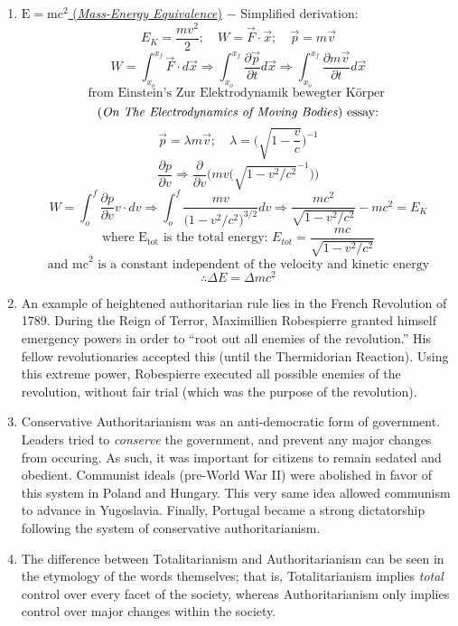 \documentclass[12pt]{article}
\begin{document}
\begin{flushleft}
\begin{enumerate}
\item \underline{$\text{E}=\text{mc}^\text{2}$ (\emph{Mass-Energy Equivalence})} $-$ Simplified derivation:
$$E_K = \frac{mv^2}{2}; \quad W=\vec{F}\cdot \vec{x}; \quad \vec{p} = m\vec{v} $$ 
$$ W = \int_{x_o}^{x_f}\vec{F}\cdot d\vec{x} \Rightarrow \int_{x_o}^{x_f}\frac{\partial\vec{p}}{\partial t} d\vec{x} \Rightarrow \int_{x_o}^{x_f}\frac{\partial m\vec{v}}{\partial t} d\vec{x} $$ 
$$ \text{from Einstein's Zur Elektrodynamik bewegter K\"orper }$$
$$\text{(\emph{On The Electrodynamics of Moving Bodies}) essay:}$$
$$\vec{p} = \lambda m\vec{v}; \quad \lambda = \biggl(\sqrt{1-\frac{v}{c}}\biggr)^{-1} $$
$$ \frac{\partial p}{\partial v} \Rightarrow \frac{\partial}{\partial v}\biggl(mv\biggl(\sqrt{1-v^2/c^2}^{-1}\biggr)\biggr) $$
$$ W = \int_o^f\frac{\partial p}{\partial v} v\cdot dv \Rightarrow \int_o^f\frac{mv}{\biggl(1-v^2/c^2\biggr)^{3/2}} dv \Rightarrow \frac{mc^2}{\sqrt{1-v^2/c^2}}-mc^2 = E_K $$
$$ \text{where $\text{E}_\text{tot}$ is the total energy: } E_{tot} = \frac{mc}{\sqrt{1-v^2/c^2}} $$
$$ \text{and mc}^\text{2} \text{ is a constant independent of the velocity and kinetic energy} $$ 
$$ \therefore \Delta E = \Delta mc^2 $$

\item An example of heightened authoritarian rule lies in the French Revolution of 1789. During the Reign of Terror, Maximillien Robespierre granted himself emergency powers in order to ``root out all enemies of the revolution.'' His fellow revolutionaries accepted this (until the Thermidorian Reaction). Using this extreme power, Robespierre executed all possible enemies of the revolution, without fair trial (which was the purpose of the revolution).

\item Conservative Authoritarianism was an anti-democratic form of government. Leaders tried to \textit{conserve} the government, and prevent any major changes from occuring. As such, it was important for citizens to remain sedated and obedient. Communist ideals (pre-World War II) were abolished in favor of this system in Poland and Hungary. This very same idea allowed communism to advance in Yugoslavia. Finally, Portugal became a strong dictatorship following the system of conservative authoritarianism.

\item The difference between Totalitarianism and Authoritarianism can be seen in the etymology of the words themselves; that is, Totalitarianism implies \textit{total} control over every facet of the society, whereas Authoritarianism only implies control over major changes within the society.


\end{enumerate}
\end{flushleft}
\end{document}
